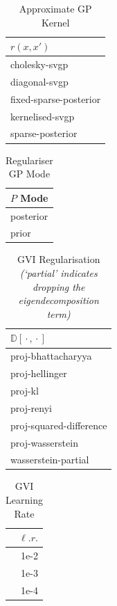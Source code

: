 \documentclass{article}
\newcommand{\wc}{\operatorname{{}\cdot{}}}
\numberwithin{equation}{section}
\begin{document}
\begin{table}[h!]
\tiny
\centering
\begin{tabular}{l}
\toprule
    $r(x, x')$ \\
\midrule
         cholesky-svgp \\
         diagonal-svgp \\
fixed-sparse-posterior \\
       kernelised-svgp \\
      sparse-posterior \\
\bottomrule
\end{tabular}
\caption{Approximate GP Kernel}
\end{table}

\begin{table}[h!]
\tiny
\centering
\begin{tabular}{l}
\toprule
$P$ Mode \\
\midrule
                      posterior \\
                          prior \\
\bottomrule
\end{tabular}
\caption{Regulariser GP Mode}
\end{table}

\begin{table}[h!]
\tiny
\centering
\begin{tabular}{l}
\toprule
  $\mathbb{D}[\wc, \wc]$ \\
\midrule
            proj-bhattacharyya \\
                proj-hellinger \\
                       proj-kl \\
                    proj-renyi \\
proj-squared-difference \\
     proj-wasserstein \\
       wasserstein-partial \\
\bottomrule
\end{tabular}
\caption{GVI Regularisation \textit{(`partial' indicates dropping the eigendecomposition term)}}
\end{table}

\begin{table}[h!]
\tiny
\centering
\begin{tabular}{r}
\toprule
 $\ell. r.$ \\
\midrule
                    1e-2 \\
                    1e-3 \\
                    1e-4 \\
\bottomrule
\end{tabular}
\caption{GVI Learning Rate}
\end{table}
\end{document}
